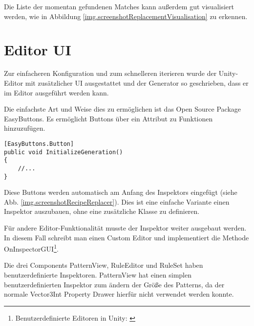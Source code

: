 Die Liste der momentan gefundenen Matches kann außerdem gut visualisiert werden, wie in Abbildung \ref{img.screenshotReplacementVisualisation} zu erkennen.



\section{Editor UI}\label{s.editorUI}

Zur einfacheren Konfiguration und zum schnelleren iterieren wurde der Unity-Editor mit zusätzlicher UI ausgestattet und der Generator so geschrieben, dass er im Editor ausgeführt werden kann. 

Die einfachste Art und Weise dies zu ermöglichen ist das Open Source Package EasyButtons. Es ermöglicht Buttons über ein Attribut zu Funktionen hinzuzufügen.

\begin{lstlisting}[label=l.buttonAttribute, caption={Beispiel eines EasyButtons-Attributs}] 
[EasyButtons.Button]
public void InitializeGeneration()
{
    //...
}
\end{lstlisting}

Diese Buttons werden automatisch am Anfang des Inspektors eingefügt (siehe Abb. \ref{img.screenshotRecipeReplacer}). Dies ist eine einfache Variante einen Inspektor auszubauen, ohne eine zusätzliche Klasse zu definieren.


Für andere Editor-Funktionalität musste der Inspektor weiter ausgebaut werden. In diesem Fall schreibt man einen Custom Editor und implementiert die Methode OnInspectorGUI\footnote{Benutzerdefinierte Editoren in Unity: \cite[Seite: editor-CustomEditors]{unityManual}}.

Die drei Components PatternView, RuleEditor und RuleSet haben benutzerdefinierte Inspektoren. PatternView hat einen simplen benutzerdefinierten Inspektor zum ändern der Größe des Patterns, da der normale Vector3Int Property Drawer hierfür nicht verwendet werden konnte. 


